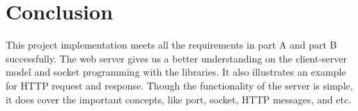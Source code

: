 \documentclass[a4paper, 11pt]{report}
\begin{document}

\section*{Conclusion}

This project implementation meets all the requirements in part A and part B successfully. The web server gives us a better understanding on the client-server model and socket programming with the libraries. It also illustrates an example for HTTP request and response. Though the functionality of the server is simple, it does cover the important concepts, like port, socket, HTTP messages, and etc.
\end{document}
